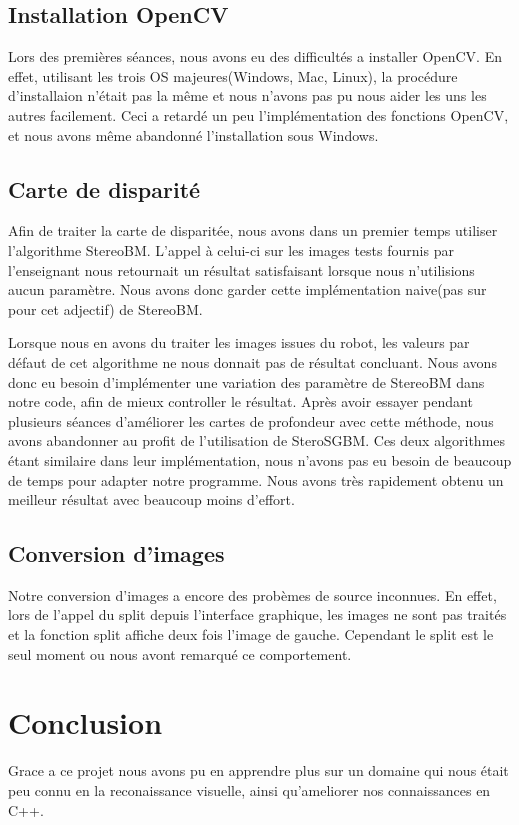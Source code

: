 \documentclass[a4paper]{article}
\begin{document}
\subsection*{Installation OpenCV}

Lors des premières séances, nous avons eu des difficultés a installer OpenCV. En effet, utilisant les trois OS majeures(Windows, Mac, Linux), la procédure d'installaion n'était pas la même et nous n'avons pas pu nous aider les uns les autres facilement. Ceci a retardé un peu l'implémentation des fonctions OpenCV, et nous avons même abandonné l'installation sous Windows.

\subsection*{Carte de disparité}

Afin de traiter la carte de disparitée, nous avons dans un premier temps utiliser l'algorithme StereoBM. L'appel à celui-ci sur les images tests fournis par l'enseignant nous retournait un résultat satisfaisant lorsque nous n'utilisions aucun paramètre. Nous avons donc garder cette implémentation naive(pas sur pour cet adjectif) de StereoBM.

Lorsque nous en avons du traiter les images issues du robot, les valeurs par défaut de cet algorithme ne nous donnait pas de résultat concluant. Nous avons donc eu besoin d'implémenter une variation des paramètre de StereoBM dans notre code, afin de mieux controller le résultat. Après avoir essayer pendant plusieurs séances d'améliorer les cartes de profondeur avec cette méthode, nous avons abandonner au profit de l'utilisation de SteroSGBM. Ces deux algorithmes étant similaire dans leur implémentation, nous n'avons pas eu besoin de beaucoup de temps pour adapter notre programme. Nous avons très rapidement obtenu un meilleur résultat avec beaucoup moins d'effort.

\subsection*{Conversion d'images}

Notre conversion d'images a encore des probèmes de source inconnues. En effet, lors de l'appel du split depuis l'interface graphique, les images ne sont pas traités et la fonction split affiche deux fois l'image de gauche. Cependant le split est le seul moment ou nous avont remarqué ce comportement.


\section{Conclusion}

Grace a ce projet nous avons pu en apprendre plus sur un domaine qui nous était peu connu en la reconaissance visuelle, ainsi qu'ameliorer nos connaissances en C++.

\end{document}

